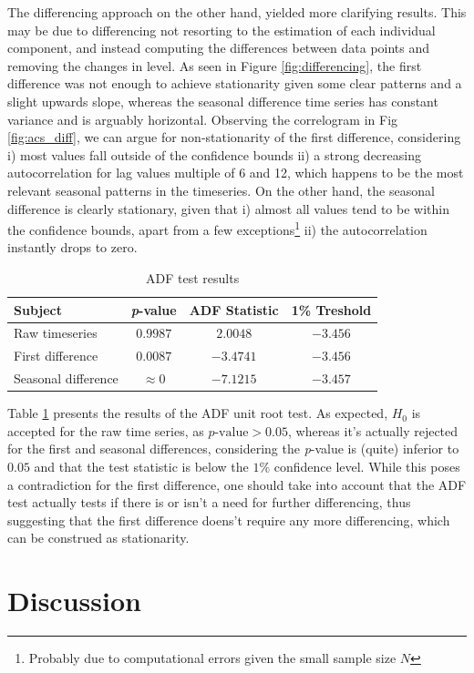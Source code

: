 \documentclass[conference]{IEEEtran}
\begin{document}
The differencing approach on the other hand, yielded more clarifying results. This may be due to differencing not resorting to the estimation of each individual component, and instead computing the differences between data points and removing the changes in level. As seen in Figure \ref{fig:differencing}, the first difference was not enough to achieve stationarity given some clear patterns and a slight upwards slope, whereas the seasonal difference time series has constant variance and is arguably horizontal. Observing the correlogram in Fig \ref{fig:acs_diff}, we can argue for non-stationarity of the first difference, considering i) most values fall outside of the confidence bounds ii) a strong decreasing autocorrelation for lag values multiple of 6 and 12, which happens to be the most relevant seasonal patterns in the timeseries. On the other hand, the seasonal difference is clearly stationary, given that i) almost all values tend to be within the confidence bounds, apart from a few exceptions\footnote{Probably due to computational errors given the small sample size $N$} ii) the autocorrelation instantly drops to zero.

\begin{table}[btp]
    \caption{ADF test results}
    \centering
    \begin{tabular}{l|c|c||c}
        Subject & \textit{p}-value & ADF Statistic & 1\% Treshold  \\
        \hline
        Raw timeseries & $0.9987$  &  $2.0048$ & $-3.456$ \\
        First difference & \cellcolor{green!25} $0.0087$ & $-3.4741$ & $-3.456$ \\
        Seasonal difference & \cellcolor{green!25} $\approx 0$ & $-7.1215$ & $-3.457$ \\
    \end{tabular}
    \label{tab:adfuller}
\end{table}

Table \ref{tab:adfuller} presents the results of the ADF unit root test. As expected, $H_0$ is accepted for the raw time series, as $p\text{-value}>0.05$, whereas it's actually rejected for the first and seasonal differences, considering the \textit{p}-value is (quite) inferior to $0.05$ and that the test statistic is below the $1\%$ confidence level. While this poses a contradiction for the first difference, one should take into account that the ADF test actually tests if there is or isn't a need for further differencing, thus suggesting that the first difference doens't require any more differencing, which can be construed as stationarity.

\section{Discussion}

%
%
\end{document}
